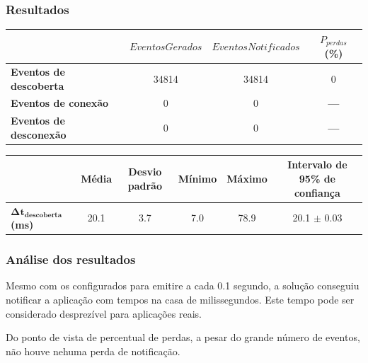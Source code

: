 \documentclass[aspectratio=169]{beamer}
\begin{document}
\begin{frame}
	\frametitle{Resultados}
	\newcommand{\nullval}{\textbf{---}}

	\begin{table}[htb]
		\begin{center}
			\begin{tabular}{lccc}
				\toprule
							       & $EventosGerados$ & $EventosNotificados$ & $P_{perdas}$ (\%) \\
				\midrule
				\textbf{Eventos de descoberta} & 34814            & 34814                & 0		     \\
				\textbf{Eventos de conexão}    & 0                & 0                    & \nullval	     \\
				\textbf{Eventos de desconexão} & 0                & 0                    & \nullval          \\
				\bottomrule
			\end{tabular}
		\end{center}
	\end{table}

	\bigskip

	\begin{table}[htb]
		\centering
		\begin{adjustbox}{max width=\textwidth}
			\begin{tabular}{lccccc}
				\toprule
									   & Média & Desvio padrão & Mínimo & Máximo & Intervalo de 95\% de confiança \\
				\midrule
				$\bm{\Delta t_{descoberta}}$ \textbf{(ms)} & 20.1  & 3.7           & 7.0 & 78.9 & 20.1 $\pm$ 0.03 	              \\
				\bottomrule
			\end{tabular}
		\end{adjustbox}
	\end{table}

\end{frame}

\begin{frame}
	\frametitle{Análise dos resultados}
	Mesmo com os \beacons configurados para emitire \broadcast a cada 0.1 segundo, a solução conseguiu notificar a aplicação com tempos na casa de milissegundos. Este tempo pode ser considerado desprezível para aplicações reais.

	\bigskip

	Do ponto de vista de percentual de perdas, a pesar do grande número de eventos, não houve nehuma perda de notificação.
\end{frame}
\end{document}
